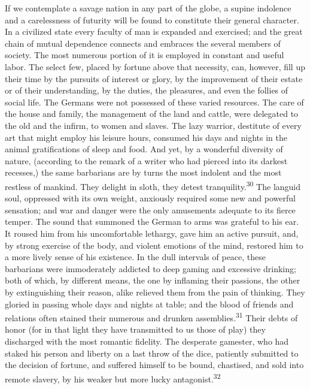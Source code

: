 If we contemplate a savage nation in any part of the globe, a
supine indolence and a carelessness of futurity will be found to
constitute their general character. In a civilized state every
faculty of man is expanded and exercised; and the great chain of
mutual dependence connects and embraces the several members of
society. The most numerous portion of it is employed in constant
and useful labor. The select few, placed by fortune above that
necessity, can, however, fill up their time by the pursuits of
interest or glory, by the improvement of their estate or of their
understanding, by the duties, the pleasures, and even the follies
of social life. The Germans were not possessed of these varied
resources. The care of the house and family, the management of
the land and cattle, were delegated to the old and the infirm, to
women and slaves. The lazy warrior, destitute of every art that
might employ his leisure hours, consumed his days and nights in
the animal gratifications of sleep and food. And yet, by a
wonderful diversity of nature, (according to the remark of a
writer who had pierced into its darkest recesses,) the same
barbarians are by turns the most indolent and the most restless
of mankind. They delight in sloth, they detest tranquility.\textsuperscript{30}
The languid soul, oppressed with its own weight, anxiously
required some new and powerful sensation; and war and danger were
the only amusements adequate to its fierce temper. The sound that
summoned the German to arms was grateful to his ear. It roused
him from his uncomfortable lethargy, gave him an active pursuit,
and, by strong exercise of the body, and violent emotions of the
mind, restored him to a more lively sense of his existence. In
the dull intervals of peace, these barbarians were immoderately
addicted to deep gaming and excessive drinking; both of which, by
different means, the one by inflaming their passions, the other
by extinguishing their reason, alike relieved them from the pain
of thinking. They gloried in passing whole days and nights at
table; and the blood of friends and relations often stained their
numerous and drunken assemblies.\textsuperscript{31} Their debts of honor (for in
that light they have transmitted to us those of play) they
discharged with the most romantic fidelity. The desperate
gamester, who had staked his person and liberty on a last throw
of the dice, patiently submitted to the decision of fortune, and
suffered himself to be bound, chastised, and sold into remote
slavery, by his weaker but more lucky antagonist.\textsuperscript{32}

